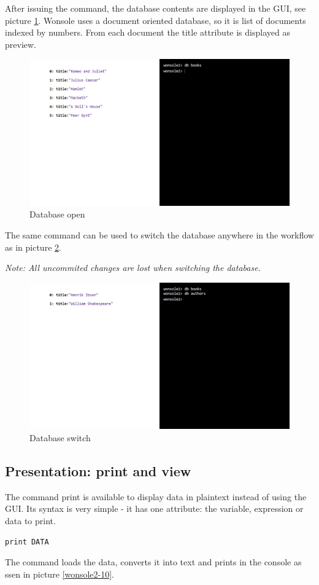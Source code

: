 After issuing the command, the database contents are displayed in the GUI, see
picture \ref{wonsole2-02}.
Wonsole uses a document oriented database, so it is list of documents indexed by numbers.
From each document the title attribute is displayed as preview.


\begin{figure}
\centering
\includegraphics[width=\textwidth]{../../manual/screenshot/wonsole2/wonsole2-02.png}
\caption{Database open}
\label{wonsole2-02}
\end{figure}

The same command can be used to switch the database anywhere in the workflow as in
picture \ref{wonsole2-04}.

\textit{Note: All uncommited changes are lost when switching the database.}

\begin{figure}
\centering
\includegraphics[width=\textwidth]{../../manual/screenshot/wonsole2/wonsole2-04.png}
\caption{Database switch}
\label{wonsole2-04}
\end{figure}

\subsection{Presentation: print and view}
The command print is available to display data in plaintext instead of using the GUI.
Its syntax is very simple - it has one attribute: the variable, expression or data to print.
\begin{verbatim}
print DATA
\end{verbatim}
The command loads the data, converts it into text and prints in the console as ssen
in picture \ref{wonsole2-10}.

